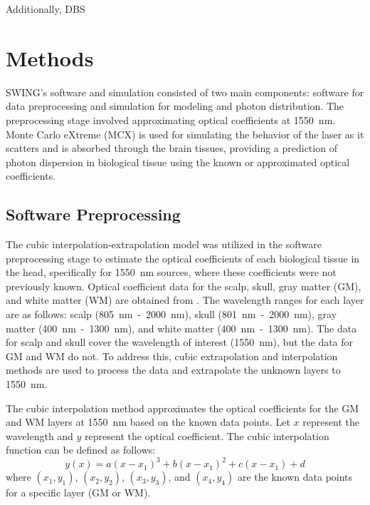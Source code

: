 \documentclass[journal,twoside,web]{ieeecolor}
\begin{document}
Additionally, DBS


\section{Methods}
\label{sec:methods}
SWING's software and simulation consisted of two main components: software for data preprocessing and simulation for modeling and photon distribution. 
The preprocessing stage involved approximating optical coefficients at 1550~nm. Monte Carlo eXtreme (MCX) \cite{b6} is used for simulating the 
behavior of the laser as it scatters and is absorbed through the brain tissues, providing a prediction of photon dispersion in biological tissue using the known or 
approximated optical coefficients.

\subsection{Software Preprocessing}
The cubic interpolation-extrapolation model was utilized in the software preprocessing stage to estimate the optical coefficients of each biological tissue in the head, 
specifically for 1550~nm sources, where these coefficients were not previously known. Optical coefficient data for the scalp, skull, gray matter (GM), and white matter (WM) 
are obtained from \cite{b5}. The wavelength ranges for each layer are as follows: scalp (805~nm~-~2000~nm), skull (801~nm~-~2000~nm), gray matter (400~nm~-~1300~nm), 
and white matter (400~nm~-~1300~nm). The data for scalp and skull cover the wavelength of interest (1550~nm), but the data for GM and WM do not. To address this, cubic extrapolation 
and interpolation methods are used to process the data and extrapolate the unknown layers to 1550~nm. 

The cubic interpolation method approximates the optical coefficients for the GM and WM layers at 1550~nm based on the known data points. Let $x$ represent the wavelength and $y$ 
represent the optical coefficient. The cubic interpolation function can be defined as follows:
\begin{equation}
    \label{eq:cubicEq1}
    y(x) = a(x-x_1)^3 + b(x-x_1)^2 + c(x-x_1) + d
\end{equation}
where $(x_1, y_1)$, $(x_2, y_2)$, $(x_3, y_3)$, and $(x_4, y_4)$ are the known data points for a specific layer (GM or WM).
\end{document}
